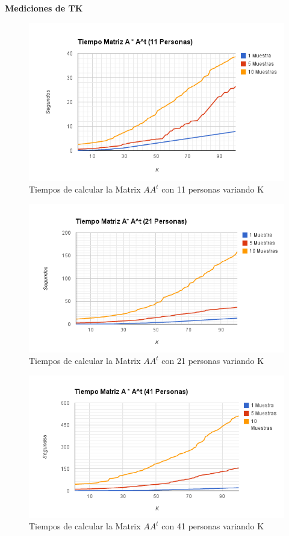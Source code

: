 \textbf{Mediciones de TK}

\begin{figure}[H]
\includegraphics[width=1\textwidth]{img/imagef1.png}
     \caption{Tiempos de calcular la Matrix $AA^t$ con 11 personas variando K}
\end{figure}

\begin{figure}[H]
\includegraphics[width=1\textwidth]{img/imagef2.png}
     \caption{Tiempos de calcular la Matrix $AA^t$ con 21 personas variando K}
\end{figure}

\begin{figure}[H]
\includegraphics[width=1\textwidth]{img/imagef3.png}
     \caption{Tiempos de calcular la Matrix $AA^t$ con 41 personas variando K}
\end{figure}



